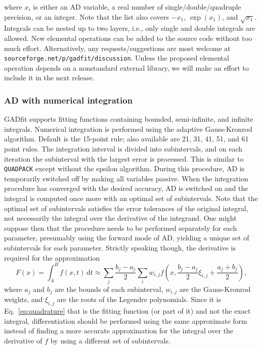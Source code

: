 \documentclass{article}
\newcommand{\D}{\,\textrm{d}}
\begin{document}
where $x_i$ is either an AD variable, a real number of
single/double/quadruple precision, or an integer. Note that the list
also covers $-x_1$, $\exp(x_1)$, and $\sqrt{x_1}$. Integrals can be
nested up to two layers, i.e., only single and double integrals are
allowed. New elemental operations can be added to the source code
without too much effort. Alternatively, any requests/suggestions are
most welcome at \texttt{sourceforge.net/p/gadfit/discussion}. Unless
the proposed elemental operation depends on a nonstandard external
library, we will make an effort to include it in the next release.

\subsubsection{AD with numerical integration}

GADfit supports fitting functions containing bounded, semi-infinite,
and infinite integrals. Numerical integration is performed using the
adaptive Gauss-Kronrod algorithm. Default is the 15-point rule; also
available are 21, 31, 41, 51, and 61 point rules. The integration
interval is divided into subintervals, and on each iteration the
subinterval with the largest error is processed. This is similar to
\texttt{QUADPACK} except without the epsilon algorithm. During this
procedure, AD is temporarily switched off by making all variables
passive. When the integration procedure has converged with the desired
accuracy, AD is switched on and the integral is computed once more
with an optimal set of subintervals. Note that the optimal set of
subintervals satisfies the error tolerances of the original integral,
not necessarily the integral over the derivative of the integrand. One
might suppose then that the procedure needs to be performed separately
for each parameter, presumably using the forward mode of AD, yielding
a unique set of subintervals for each parameter. Strictly speaking
though, the derivative is required for the approximation
\begin{equation}
  \label{eq:quadrature}
  F(x) = \int_A^B f(x,t) \D t \approx \sum_j \frac{b_j-a_j}{2}\sum_i
  w_{i,j} f \left( x, \frac{b_j-a_j}{2}\xi_{i,j} + \frac{a_j+b_j}{2}
  \right),
\end{equation}
where $a_j$ and $b_j$ are the bounds of each subinterval, $w_{i,j}$
are the Gauss-Kronrod weights, and $\xi_{i,j}$ are the roots of the
Legendre polynomials. Since it is Eq.~\eqref{eq:quadrature} that is
the fitting function (or part of it) and not the exact integral,
differentiation should be performed using the same approximate form
instead of finding a more accurate approximation for the integral over
the derivative of $f$ by using a different set of subintervals.
\end{document}
